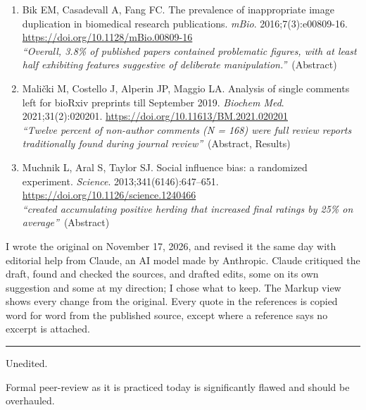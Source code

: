 \documentclass[12pt]{article}
\begin{document}
{\begin{enumerate}[leftmargin=1.8em,itemsep=5pt,topsep=0pt,label=\arabic*.]
\item \hypertarget{ref-bik2016}{}Bik EM, Casadevall A, Fang FC. The prevalence of inappropriate image duplication in biomedical research publications. \textit{mBio}. 2016;7(3):e00809-16. \url{https://doi.org/10.1128/mBio.00809-16}\\[1pt]{\color{quote}\itshape ``Overall, 3.8\% of published papers contained problematic figures, with at least half exhibiting features suggestive of deliberate manipulation.''}~{\color{quote}\footnotesize(Abstract)}
\item \hypertarget{ref-malicki2021}{}Mali\v{c}ki M, Costello J, Alperin JP, Maggio LA. Analysis of single comments left for bioRxiv preprints till September 2019. \textit{Biochem Med}. 2021;31(2):020201. \url{https://doi.org/10.11613/BM.2021.020201}\\[1pt]{\color{quote}\itshape ``Twelve percent of non-author comments (N = 168) were full review reports traditionally found during journal review''}~{\color{quote}\footnotesize(Abstract, Results)}
\item \hypertarget{ref-muchnik2013}{}Muchnik L, Aral S, Taylor SJ. Social influence bias: a randomized experiment. \textit{Science}. 2013;341(6146):647--651. \url{https://doi.org/10.1126/science.1240466}\\[1pt]{\color{quote}\itshape ``created accumulating positive herding that increased final ratings by 25\% on average''}~{\color{quote}\footnotesize(Abstract)}
\end{enumerate}
}

\clearpage
{\fontsize{11.7}{16.38}\selectfont\setlength{\parindent}{0pt}\setlength{\parskip}{6pt}
\par
I wrote the original on November 17, 2026, and revised it the same day with editorial help from Claude, an AI model made by Anthropic. Claude critiqued the draft, found and checked the sources, and drafted edits, some on its own suggestion and some at my direction; I chose what to keep. The Markup view shows every change from the original. Every quote in the references is copied word for word from the published source, except where a reference says no excerpt is attached.\par
\vspace{10pt}
{\color{rule}\noindent\rule{\textwidth}{0.4pt}}\par
{} Unedited.\par
}
\fontsize{13.0}{18.85}\selectfont\setlength{\parskip}{6.5pt}
Formal peer-review as it is practiced today is significantly flawed and should be overhauled.
\end{document}
